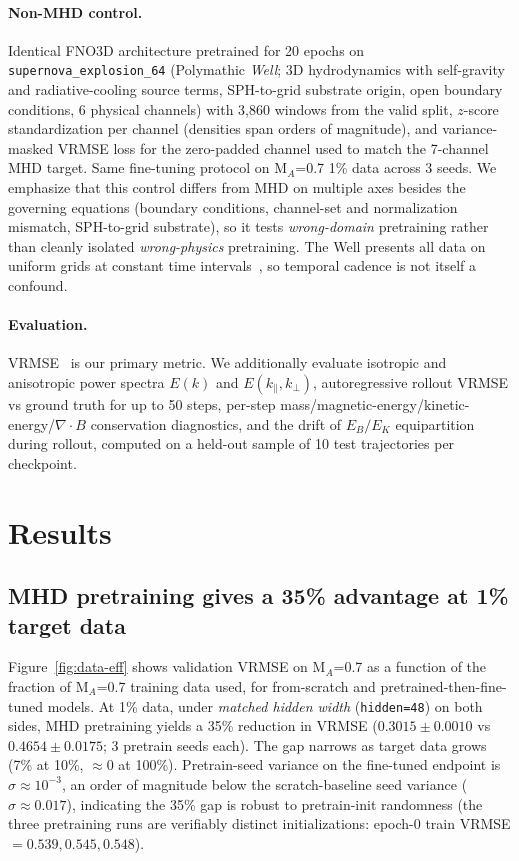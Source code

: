 \documentclass{article}
\begin{document}
\paragraph{Non-MHD control.} Identical FNO3D architecture pretrained for 20 epochs on \texttt{supernova\_explosion\_64} (Polymathic \emph{Well}; 3D hydrodynamics with self-gravity and radiative-cooling source terms, SPH-to-grid substrate origin, open boundary conditions, 6 physical channels) with 3,860 windows from the valid split, $z$-score standardization per channel (densities span orders of magnitude), and variance-masked VRMSE loss for the zero-padded channel used to match the 7-channel MHD target. Same fine-tuning protocol on M$_A$=0.7 1\% data across 3 seeds. We emphasize that this control differs from MHD on multiple axes besides the governing equations (boundary conditions, channel-set and normalization mismatch, SPH-to-grid substrate), so it tests \emph{wrong-domain} pretraining rather than cleanly isolated \emph{wrong-physics} pretraining. The Well presents all data on uniform grids at constant time intervals~\cite{ohana2024well}, so temporal cadence is not itself a confound.

\paragraph{Evaluation.} VRMSE~\cite{ohana2024well} is our primary metric. We additionally evaluate isotropic and anisotropic power spectra $E(k)$ and $E(k_\parallel, k_\perp)$, autoregressive rollout VRMSE vs ground truth for up to 50 steps, per-step mass/magnetic-energy/kinetic-energy/$\nabla\cdot B$ conservation diagnostics, and the drift of $E_B/E_K$ equipartition during rollout, computed on a held-out sample of 10 test trajectories per checkpoint.

\section{Results}

\subsection{MHD pretraining gives a 35\% advantage at 1\% target data}

Figure~\ref{fig:data-eff} shows validation VRMSE on M$_A$=0.7 as a function of the fraction of M$_A$=0.7 training data used, for from-scratch and pretrained-then-fine-tuned models. At 1\% data, under \emph{matched hidden width} (\texttt{hidden=48}) on both sides, MHD pretraining yields a 35\% reduction in VRMSE ($0.3015 \pm 0.0010$ vs $0.4654 \pm 0.0175$; 3 pretrain seeds each). The gap narrows as target data grows (7\% at 10\%, $\approx$0 at 100\%). Pretrain-seed variance on the fine-tuned endpoint is $\sigma \approx 10^{-3}$, an order of magnitude below the scratch-baseline seed variance ($\sigma \approx 0.017$), indicating the 35\% gap is robust to pretrain-init randomness (the three pretraining runs are verifiably distinct initializations: epoch-0 train VRMSE $= 0.539, 0.545, 0.548$).
\end{document}

